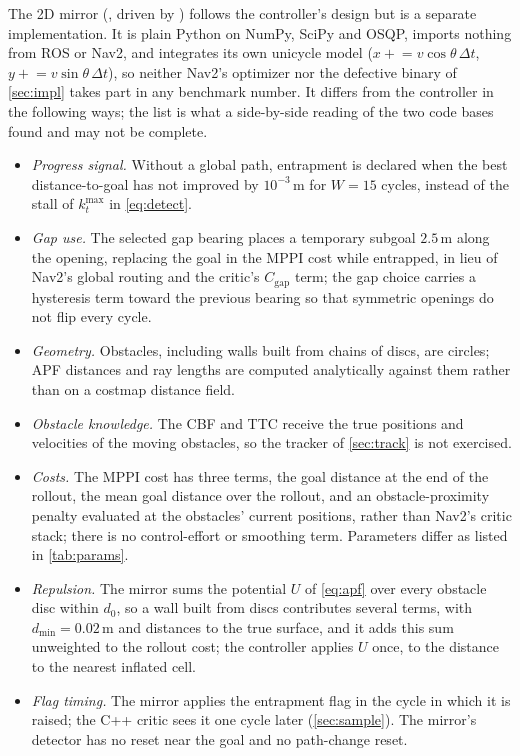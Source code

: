 The 2D mirror (, driven by ) follows the controller's design but is a separate implementation. It is plain Python on NumPy, SciPy and OSQP, imports nothing from ROS or Nav2, and integrates its own unicycle model ($x\mathrel{+}=v\cos\theta\,\Delta t$, $y\mathrel{+}=v\sin\theta\,\Delta t$), so neither Nav2's optimizer nor the defective binary of \cref{sec:impl} takes part in any benchmark number. It differs from the controller in the following ways; the list is what a side-by-side reading of the two code bases found and may not be complete.
\begin{itemize}
    \item \emph{Progress signal.} Without a global path, entrapment is declared when the best distance-to-goal has not improved by $10^{-3}$\,m for $W=15$ cycles, instead of the stall of $k^{\max}_t$ in \eqref{eq:detect}.
    \item \emph{Gap use.} The selected gap bearing places a temporary subgoal $2.5$\,m along the opening, replacing the goal in the MPPI cost while entrapped, in lieu of Nav2's global routing and the critic's $C_{\mathrm{gap}}$ term; the gap choice carries a hysteresis term toward the previous bearing so that symmetric openings do not flip every cycle.
    \item \emph{Geometry.} Obstacles, including walls built from chains of discs, are circles; APF distances and ray lengths are computed analytically against them rather than on a costmap distance field.
    \item \emph{Obstacle knowledge.} The CBF and TTC receive the true positions and velocities of the moving obstacles, so the tracker of \cref{sec:track} is not exercised.
    \item \emph{Costs.} The MPPI cost has three terms, the goal distance at the end of the rollout, the mean goal distance over the rollout, and an obstacle-proximity penalty evaluated at the obstacles' current positions, rather than Nav2's critic stack; there is no control-effort or smoothing term. Parameters differ as listed in \cref{tab:params}.
    \item \emph{Repulsion.} The mirror sums the potential $U$ of \eqref{eq:apf} over every obstacle disc within $d_0$, so a wall built from discs contributes several terms, with $d_{\min}=0.02$\,m and distances to the true surface, and it adds this sum unweighted to the rollout cost; the controller applies $U$ once, to the distance to the nearest inflated cell.
    \item \emph{Flag timing.} The mirror applies the entrapment flag in the cycle in which it is raised; the C++ critic sees it one cycle later (\cref{sec:sample}). The mirror's detector has no reset near the goal and no path-change reset.

\end{itemize}

